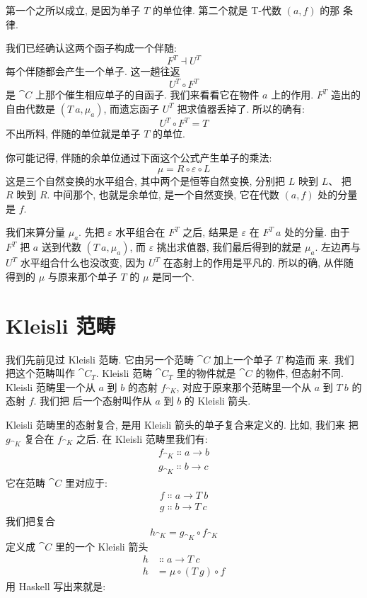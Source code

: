 \noindent
第一个之所以成立, 是因为单子 $T$ 的单位律. 第二个就是 T-代数 $(a, f)$ 的那
条律.

我们已经确认这两个函子构成一个伴随:
\[F^T \dashv U^T\]
每个伴随都会产生一个单子. 这一趟往返
\[U^T \circ F^T\]
是 $\cat{C}$ 上那个催生相应单子的自函子. 我们来看看它在物件 $a$ 上的作用.
$F^T$ 造出的自由代数是 $(T\ a, \mu_a)$, 而遗忘函子 $U^T$ 把求值器丢掉了.
所以的确有:
\[U^T \circ F^T = T\]
不出所料, 伴随的单位就是单子 $T$ 的单位.

你可能记得, 伴随的余单位通过下面这个公式产生单子的乘法:
\[\mu = R \circ \varepsilon \circ L\]
这是三个自然变换的水平组合, 其中两个是恒等自然变换, 分别把 $L$ 映到 $L$、
把 $R$ 映到 $R$. 中间那个, 也就是余单位, 是一个自然变换, 它在代数 $(a, f)$
处的分量是 $f$.

我们来算分量 $\mu_a$. 先把 $\varepsilon$ 水平组合在 $F^T$ 之后, 结果是
$\varepsilon$ 在 $F^T\ a$ 处的分量. 由于 $F^T$ 把 $a$ 送到代数
$(T\ a, \mu_a)$, 而 $\varepsilon$ 挑出求值器, 我们最后得到的就是 $\mu_a$.
左边再与 $U^T$ 水平组合什么也没改变, 因为 $U^T$ 在态射上的作用是平凡的.
所以的确, 从伴随得到的 $\mu$ 与原来那个单子 $T$ 的 $\mu$ 是同一个.

\section{Kleisli 范畴}

我们先前见过 Kleisli 范畴. 它由另一个范畴 $\cat{C}$ 加上一个单子 $T$ 构造而
来. 我们把这个范畴叫作 $\cat{C}_T$. Kleisli 范畴 $\cat{C}_T$ 里的物件就是
$\cat{C}$ 的物件, 但态射不同. Kleisli 范畴里一个从 $a$ 到 $b$ 的态射
$f_{\cat{K}}$, 对应于原来那个范畴里一个从 $a$ 到 $T\ b$ 的态射 $f$. 我们把
后一个态射叫作从 $a$ 到 $b$ 的 Kleisli 箭头.

Kleisli 范畴里的态射复合, 是用 Kleisli 箭头的单子复合来定义的. 比如, 我们来
把 $g_{\cat{K}}$ 复合在 $f_{\cat{K}}$ 之后. 在 Kleisli 范畴里我们有:
\begin{gather*}
  f_{\cat{K}} \Colon a \to b \\
  g_{\cat{K}} \Colon b \to c
\end{gather*}
它在范畴 $\cat{C}$ 里对应于:
\begin{gather*}
  f \Colon a \to T\ b \\
  g \Colon b \to T\ c
\end{gather*}
我们把复合
\[h_{\cat{K}} = g_{\cat{K}} \circ f_{\cat{K}}\]
定义成 $\cat{C}$ 里的一个 Kleisli 箭头
\begin{align*}
  h & \Colon a \to T\ c          \\
  h & = \mu \circ (T\ g) \circ f
\end{align*}
用 Haskell 写出来就是:

